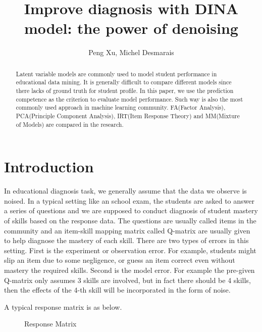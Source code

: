 \documentclass[11pt]{article}
\begin{document}
\title{\bf\Large Improve diagnosis with DINA model: the power of denoising}
\author{Peng Xu, Michel Desmarais}
\date{}
\maketitle

\begin{abstract}
Latent variable models are commonly used to model student performance in educational data mining. It is generally difficult to compare different models since there lacks of ground truth for student profile. In this paper, we use the prediction competence as the criterion to evaluate model performance. Such way is also the most commonly used approach in machine learning community. FA(Factor Analysis), PCA(Principle Component Analysis), IRT(Item Response Theory) and MM(Mixture of Models) are compared in the research.
\end{abstract}

\section{Introduction}
In educational diagnosis task, we generally assume that the data we observe is noised. In a typical setting like an school exam, the students are asked to answer a series of questions and we are supposed to conduct diagnosis of student mastery of skills based on the response data. The questions are usually called items in the community and an item-skill mapping matrix called Q-matrix are usually given to help diagnose the mastery of each skill. There are two types of errors in this setting. First is the experiment or observation error. For example, students might slip an item due to some negligence, or guess an item correct even without mastery the required skills. Second is the model error. For example the pre-given Q-matrix only assumes 3 skills are involved, but in fact there should be 4 skills, then the effects of the 4-th skill will be incorporated in the form of noise. 

A typical response matrix is as below.
\begin{figure}
\centering
\caption{Response Matrix}
\label{fig:response}
\end{figure}
\end{document}
